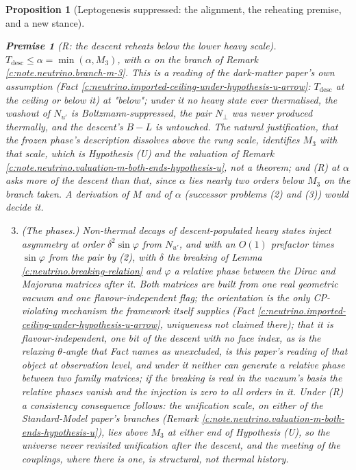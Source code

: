 \documentclass[11pt]{article}
\newtheorem{proposition}[theorem]{Proposition}
\theoremstyle{definition}
\newtheorem{premise}[theorem]{Premise}
\theoremstyle{plain}
\begin{document}
\begin{proposition}[Leptogenesis suppressed: the alignment, the reheating premise, and a new stance]
\begin{enumerate}
\end{enumerate}
\begin{premise}[R: the descent reheats below the lower heavy scale]
$T_{\mathrm{desc}} \le \alpha = \min(\alpha, M_{3})$, with $\alpha$ on the branch of Remark \ref{c:note.neutrino.branch-m-3}. This is a reading of the dark-matter paper's own assumption (Fact \ref{c:neutrino.imported-ceiling-under-hypothesis-u-arrow}: $T_{\mathrm{desc}}$ at the ceiling or below it) at "below"; under it no heavy state ever thermalised, the washout of $N_{u'}$ is Boltzmann-suppressed, the pair $N_{\perp}$ was never produced thermally, and the descent's $B - L$ is untouched. The natural justification, that the frozen phase's description dissolves above the rung scale, identifies $M_{3}$ with that scale, which is Hypothesis (U) and the valuation of Remark \ref{c:note.neutrino.valuation-m-both-ends-hypothesis-u}, not a theorem; and (R) at $\alpha$ asks more of the descent than that, since $\alpha$ lies nearly two orders below $M_{3}$ on the branch taken. A derivation of $M$ and of $\alpha$ (successor problems (2) and (3)) would decide it.
\end{premise}
\begin{enumerate}
\setcounter{enumi}{2}
\item \emph{(The phases.)} Non-thermal decays of descent-populated heavy states inject asymmetry at order $\delta^{2}\sin\varphi$ from $N_{u'}$, and with an $O(1)$ prefactor times $\sin\varphi$ from the pair by (2), with $\delta$ the breaking of Lemma \ref{c:neutrino.breaking-relation} and $\varphi$ a relative phase between the Dirac and Majorana matrices after it. Both matrices are built from one real geometric vacuum and one flavour-independent flag; the orientation is the only CP-violating mechanism the framework itself supplies (Fact \ref{c:neutrino.imported-ceiling-under-hypothesis-u-arrow}, uniqueness not claimed there); that it is flavour-independent, one bit of the descent with no face index, as is the relaxing $\theta$-angle that Fact names as unexcluded, is this paper's reading of that object at observation level, and under it neither can generate a \emph{relative} phase between two family matrices; if the breaking is real in the vacuum's basis the relative phases vanish and the injection is zero to all orders in it. Under (R) a consistency consequence follows: the unification scale, on either of the Standard-Model paper's branches (Remark \ref{c:note.neutrino.valuation-m-both-ends-hypothesis-u}), lies above $M_{3}$ at either end of Hypothesis (U), so the universe never revisited unification after the descent, and the meeting of the couplings, where there is one, is structural, not thermal history.

\end{enumerate}
\end{proposition}
\end{document}
